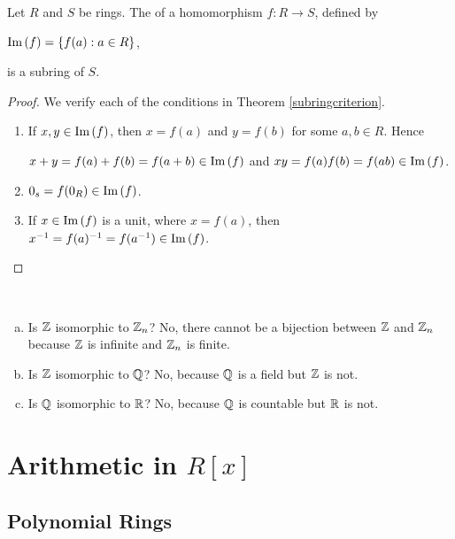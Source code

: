 \documentclass[11pt,fleqn,dvipsnames,usenames]{article}
\begin{document}
%
\begin{corollary}
Let $R$ and $S$ be rings.  The  of a homomorphism $f:R\to S$, defined by
\begin{center}
$\text{Im}\left(f\right) = \left\{f(a):a\in R\right\}$,
\end{center}
is a subring of $S$.
\end{corollary}
%
\begin{proof}
We verify each of the conditions in Theorem \ref{subringcriterion}.
\begin{enumerate}[(1)]
\item If $x,y\in \text{Im}\left(f\right)$, then $x = f(a)$ and $y = f(b)$ for some $a,b\in R$.  Hence
\begin{center}
$x+y = f(a) + f(b) = f(a+b)\in \text{Im}\left(f\right)$ and $xy = f(a)f(b) = f(ab)\in \text{Im}\left(f\right)$.
\end{center}
\item $0_{s} = f(0_{R})\in\text{Im}\left(f\right)$.
\item If $x\in\text{Im}\left(f\right)$ is a unit, where $x = f(a)$, then $x^{-1} = f(a)^{-1} = f(a^{-1})\in \text{Im}\left(f\right)$.\qedhere
\end{enumerate}
\end{proof}
%
\begin{examples}~
\begin{enumerate}[(a)]
\item Is $\mathbb{Z}$ isomorphic to $\mathbb{Z}_{n}$?  No, there cannot be a bijection between $\mathbb{Z}$ and $\mathbb{Z}_{n}$ because $\mathbb{Z}$ is infinite and $\mathbb{Z}_{n}$ is finite.
\item Is $\mathbb{Z}$ isomorphic to $\mathbb{Q}$?  No, because $\mathbb{Q}$ is a field but $\mathbb{Z}$ is not.
\item Is $\mathbb{Q}$ isomorphic to $\mathbb{R}$?  No, because $\mathbb{Q}$ is countable but $\mathbb{R}$ is not.
\end{enumerate}
\end{examples}

\section{Arithmetic in $R[x]$}\label{polynomialchapter}
\subsection{Polynomial Rings}
\end{document}
